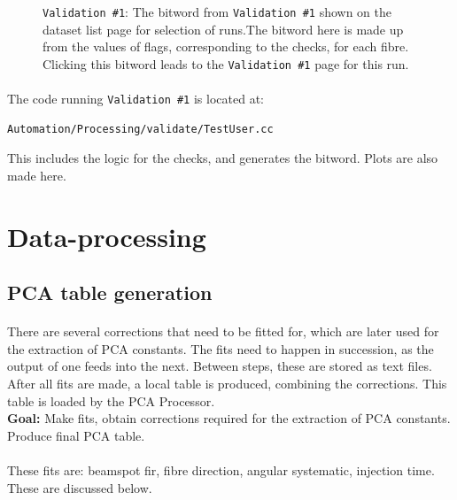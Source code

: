 \documentclass[12pt]{article}
\begin{document}
\begin{figure}
\centering
\noindent{}
  \caption{\centering \texttt{Validation \#1}: The bitword from \texttt{Validation \#1} shown on the dataset list page for selection of runs.\hspace{\textwidth}The bitword here is made up from the values of flags, corresponding to the checks, for each fibre. Clicking this bitword leads to the \texttt{Validation \#1} page for this run.}
  \label{fig:val15}
\end{figure}

\paragraph{}
The code running \texttt{Validation \#1} is located at:
\begin{lstlisting}
Automation/Processing/validate/TestUser.cc
\end{lstlisting}
This includes the logic for the checks, and generates the bitword. Plots are also made here.

\clearpage

\section{Data-processing}
\subsection{PCA table generation}\label{sec:fits}
\paragraph{}
There are several corrections that need to be fitted for, which are later used for the extraction of PCA constants. The fits need to happen in succession, as the output of one feeds into the next. Between steps, these are stored as text files. After all fits are made, a local table is produced, combining the corrections. This table is loaded by the PCA Processor.\\
\textbf{Goal:} Make fits, obtain corrections required for the extraction of PCA constants. Produce final PCA table.
\paragraph{}
These fits are: beamspot fir, fibre direction, angular systematic, injection time. These are discussed below.
\end{document}
